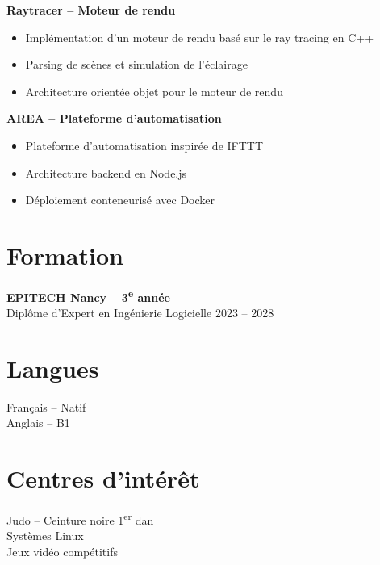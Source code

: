 \documentclass[11pt,a4paper]{article}
\begin{document}
\textbf{Raytracer -- Moteur de rendu}

\begin{itemize}
\item Implémentation d’un moteur de rendu basé sur le ray tracing en C++
\item Parsing de scènes et simulation de l’éclairage
\item Architecture orientée objet pour le moteur de rendu
\end{itemize}

\textbf{AREA -- Plateforme d’automatisation}

\begin{itemize}
\item Plateforme d’automatisation inspirée de IFTTT
\item Architecture backend en Node.js
\item Déploiement conteneurisé avec Docker
\end{itemize}

\section*{Formation}

\textbf{EPITECH Nancy -- 3\textsuperscript{e} année} \\
Diplôme d’Expert en Ingénierie Logicielle \hfill 2023 -- 2028

\begin{minipage}[t]{0.48\textwidth}

\section*{Langues}

Français -- Natif \\
Anglais -- B1

\end{minipage}
\hfill
\begin{minipage}[t]{0.48\textwidth}

\section*{Centres d’intérêt}

Judo -- Ceinture noire 1\textsuperscript{er} dan \\
Systèmes Linux \\
Jeux vidéo compétitifs

\end{minipage}
\end{document}
